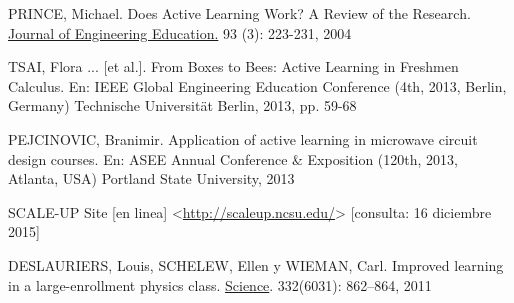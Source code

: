 

\begin{thebibliography}{9}

    PRINCE, Michael.
    Does Active Learning Work? A Review of the Research.
    \uline{Journal of Engineering Education.}
    93 (3): 223-231, 2004

    TSAI, Flora ... [et al.].
    From Boxes to Bees:
        Active Learning in Freshmen Calculus.
    En: IEEE Global Engineering Education Conference
    (4th, 2013, Berlin, Germany)
    Technische Universität Berlin,
    2013,
    pp. 59-68

    PEJCINOVIC, Branimir.
    Application of active learning in microwave circuit
        design courses.
    En: ASEE Annual Conference \& Exposition
    (120th, 2013, Atlanta, USA)
    Portland State University,
    2013

    SCALE-UP Site [en linea]
    <\url{http://scaleup.ncsu.edu/}>
    [consulta: 16 diciembre 2015]

    DESLAURIERS, Louis, SCHELEW, Ellen y WIEMAN, Carl.
    Improved learning in a large-enrollment physics class.
    \uline{Science}.
    332(6031): 862–864,
    2011


\end{thebibliography}
